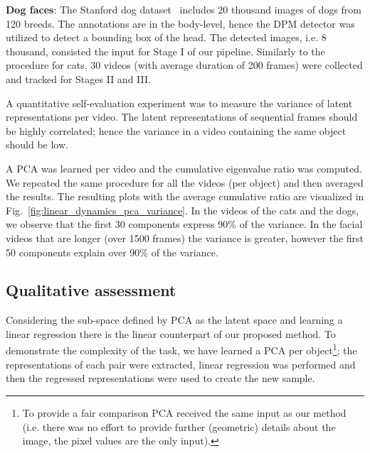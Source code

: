 \documentclass[10pt,twocolumn,letterpaper]{article}
\begin{document}
\textbf{Dog faces}: The Stanford dog dataset~\cite{khosla2011novel} includes 20 thousand images of dogs from 120 breeds. The annotations are in the body-level, hence the DPM detector was utilized to detect a bounding box of the head. The detected images, i.e. 8 thousand, consisted the input for Stage I of our pipeline. Similarly to the procedure for cats, 30 videos (with average duration of 200 frames) were collected and tracked for Stages II and III. 

A quantitative self-evaluation experiment was to measure the variance of latent representations per video. The latent representations of sequential frames should be highly correlated; hence the variance in a video containing the same object should be low. 

A PCA was learned per video and the cumulative eigenvalue ratio was computed. We repeated the same procedure for all the videos (per object) and then averaged the results. The resulting plots with the average cumulative ratio are visualized in Fig.~\ref{fig:linear_dynamics_pca_variance}. In the videos of the cats and the dogs, we observe that the first 30 components express 90\% of the variance. In the facial videos that are longer (over 1500 frames) the variance is greater, however the first 50 components explain over 90\% of the variance. 

\subsection{Qualitative assessment}
Considering the sub-space defined by PCA as the latent space and learning a linear regression there is the linear counterpart of our proposed method. To demonstrate the complexity of the task, we have learned a PCA per object\footnote{To provide a fair comparison PCA received the same input as our method (i.e. there was no effort to provide further (geometric) details about the image, the pixel values are the only input).}; the representations of each pair were extracted, linear regression was performed and then the regressed representations were used to create the new sample. 
\end{document}
